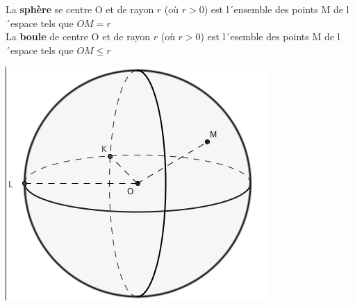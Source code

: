 
La \textbf{sphère} se centre O et de rayon $r$ (où $r>0$) est l´ensemble des points M de l´espace tels que $OM=r$\\
La \textbf{boule} de centre O et de rayon $r$  (où $r>0$) est l´esemble des points M de l´espace tels que $OM \leq r$
\begin{center}
\includegraphics[scale=0.4]{RepS-Sphere.jpg} 
\end{center}

